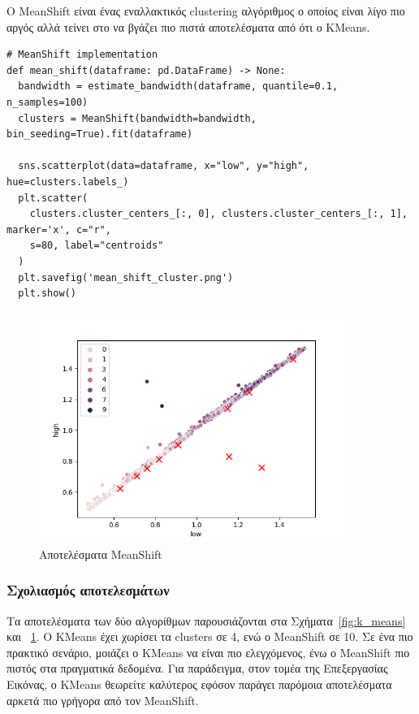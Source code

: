 Ο MeanShift είναι ένας εναλλακτικός clustering αλγόριθμος ο οποίος είναι λίγο πιο αργός αλλά τείνει στο να βγάζει πιο πιστά αποτελέσματα από ότι ο KMeans.

\begin{verbatim}
# MeanShift implementation
def mean_shift(dataframe: pd.DataFrame) -> None:
  bandwidth = estimate_bandwidth(dataframe, quantile=0.1, n_samples=100)
  clusters = MeanShift(bandwidth=bandwidth, bin_seeding=True).fit(dataframe)

  sns.scatterplot(data=dataframe, x="low", y="high", hue=clusters.labels_)
  plt.scatter(
    clusters.cluster_centers_[:, 0], clusters.cluster_centers_[:, 1], marker='x', c="r",
    s=80, label="centroids"
  )
  plt.savefig('mean_shift_cluster.png')
  plt.show()
\end{verbatim}

\begin{figure}[H]
  \centering
  \includegraphics[width=100mm]{Figures/mean_shift_cluster.png}
  \caption{Αποτελέσματα MeanShift}
  \label{fig:mean_shift}
\end{figure}

\subsubsection{Σχολιασμός αποτελεσμάτων}
\label{chap:results}

Τα αποτελέσματα των δύο αλγορίθμων παρουσιάζονται στα Σχήματα~\ref{fig:k_means} και ~\ref{fig:mean_shift}. Ο KMeans έχει χωρίσει τα clusters σε 4, ενώ ο MeanShift σε 10. Σε ένα πιο πρακτικό σενάριο, μοιάζει ο KMeans να είναι πιο ελεγχόμενος, ένω ο MeanShift πιο πιστός στα πραγματικά δεδομένα. Για παράδειγμα, στον τομέα της Επεξεργασίας Εικόνας, ο KMeans θεωρείτε καλύτερος εφόσον παράγει παρόμοια αποτελέσματα αρκετά πιο γρήγορα από τον MeanShift.

